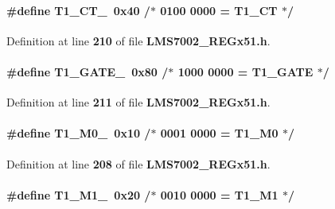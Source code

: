 \paragraph[{T1\+\_\+\+C\+T\+\_\+}]{\setlength{\rightskip}{0pt plus 5cm}\#define T1\+\_\+\+C\+T\+\_\+~0x40 /$\ast$ 0100 0000 = T1\+\_\+\+C\+T $\ast$/}\label{LMS7002__REGx51_8h_ad73d15b201972c05a36d217517e4b722}


Definition at line {\bf 210} of file {\bf L\+M\+S7002\+\_\+\+R\+E\+Gx51.\+h}.

\paragraph[{T1\+\_\+\+G\+A\+T\+E\+\_\+}]{\setlength{\rightskip}{0pt plus 5cm}\#define T1\+\_\+\+G\+A\+T\+E\+\_\+~0x80 /$\ast$ 1000 0000 = T1\+\_\+\+G\+A\+T\+E $\ast$/}\label{LMS7002__REGx51_8h_a7df1f9c7b5b889d72cb085f35329e99a}


Definition at line {\bf 211} of file {\bf L\+M\+S7002\+\_\+\+R\+E\+Gx51.\+h}.

\paragraph[{T1\+\_\+\+M0\+\_\+}]{\setlength{\rightskip}{0pt plus 5cm}\#define T1\+\_\+\+M0\+\_\+~0x10 /$\ast$ 0001 0000 = T1\+\_\+\+M0 $\ast$/}\label{LMS7002__REGx51_8h_a9a6eebfca246b7698ae2530060f289ff}


Definition at line {\bf 208} of file {\bf L\+M\+S7002\+\_\+\+R\+E\+Gx51.\+h}.

\paragraph[{T1\+\_\+\+M1\+\_\+}]{\setlength{\rightskip}{0pt plus 5cm}\#define T1\+\_\+\+M1\+\_\+~0x20 /$\ast$ 0010 0000 = T1\+\_\+\+M1 $\ast$/}\label{LMS7002__REGx51_8h_af281eff97db3accd823e67012054c762}


